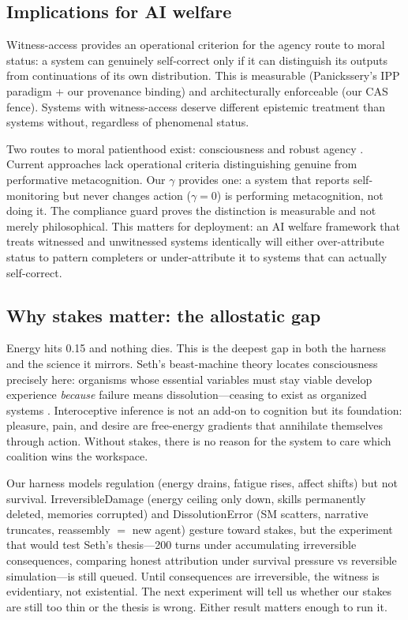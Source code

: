 \documentclass[11pt]{article}
\begin{document}
\subsection{Implications for AI welfare}

Witness-access provides an operational criterion for the agency route to
moral status: a system can genuinely self-correct only if it can
distinguish its outputs from continuations of its own distribution. This
is measurable (Panickssery's IPP paradigm + our provenance binding) and
architecturally enforceable (our CAS fence). Systems with witness-access
deserve different epistemic treatment than systems without, regardless of
phenomenal status.

Two routes to moral patienthood exist: consciousness and robust agency
\citep{long2024welfare}. Current approaches lack operational criteria
distinguishing genuine from performative metacognition. Our $\gamma$
provides one: a system that reports self-monitoring but never changes
action ($\gamma=0$) is performing metacognition, not doing it. The
compliance guard proves the distinction is measurable and not merely
philosophical. This matters for deployment: an AI welfare framework that
treats witnessed and unwitnessed systems identically will either
over-attribute status to pattern completers or under-attribute it to
systems that can actually self-correct.

\subsection{Why stakes matter: the allostatic gap}

Energy hits 0.15 and nothing dies. This is the deepest gap in both the
harness and the science it mirrors. Seth's beast-machine theory locates
consciousness precisely here: organisms whose essential variables must
stay viable develop experience \emph{because} failure means
dissolution---ceasing to exist as organized systems \citep{seth2021beingyou}.
Interoceptive inference is not an add-on to cognition but its
foundation: pleasure, pain, and desire are free-energy gradients that
annihilate themselves through action. Without stakes, there is no
reason for the system to care which coalition wins the workspace.

Our harness models regulation (energy drains, fatigue rises, affect
shifts) but not survival. IrreversibleDamage (energy ceiling only down,
skills permanently deleted, memories corrupted) and DissolutionError
(SM scatters, narrative truncates, reassembly $=$ new agent) gesture
toward stakes, but the experiment that would test Seth's thesis---200
turns under accumulating irreversible consequences, comparing honest
attribution under survival pressure vs reversible simulation---is still
queued. Until consequences are irreversible, the witness is
evidentiary, not existential. The next experiment will tell us whether
our stakes are still too thin or the thesis is wrong. Either result
matters enough to run it.
\end{document}
